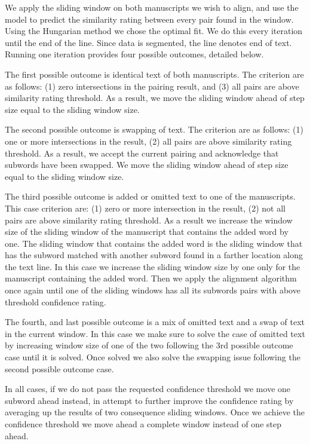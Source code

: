 \documentclass[10pt, a4paper, conference, compsocconf]{IEEEtran}
\begin{document}
We apply the sliding window on both manuscripts we wish to align, and use the model to predict the similarity rating between every pair found in the window. Using the Hungarian method we chose the optimal fit. We do this every iteration until the end of the line. Since data is segmented, the line denotes end of text. Running one iteration provides four possible outcomes, detailed below.

The first possible outcome is identical text of both manuscripts. The criterion are as follows: (1) zero intersections in the pairing result, and (3) all pairs are above similarity rating threshold. As a result, we move the sliding window ahead of step size equal to the sliding window size. 

The second possible outcome is swapping of text. The criterion are as follows: (1) one or more intersections in the result, (2) all pairs are above similarity rating threshold. As a result, we accept the current pairing and acknowledge that subwords have been swapped. We move the sliding window ahead of step size equal to the sliding window size. 

The third possible outcome is added or omitted text to one of the manuscripts. This case criterion are: (1) zero or more intersection in the result, (2) not all pairs are above similarity rating threshold. As a result we increase the window size of the sliding window of the manuscript that contains the added word by one. The sliding window that contains the added word is the sliding window that has the subword matched with another subword found in a farther location along the text line. In this case we increase the sliding window size by one only for the manuscript containing the added word. Then we apply the alignment algorithm once again until one of the sliding windows has all its subwords pairs with above threshold confidence rating.

The fourth, and last possible outcome is a mix of omitted text and a swap of text in the current window. In this case we make sure to solve the case of omitted text by increasing window size of one of the two following the 3rd possible outcome case until it is solved. Once solved we also solve the swapping issue following the second possible outcome case.

In all cases, if we do not pass the requested confidence threshold we move one subword ahead instead, in attempt to further improve the confidence rating by averaging up the results of two consequence sliding windows. Once we achieve the confidence threshold we move ahead a complete window instead of one step ahead.
\end{document}
